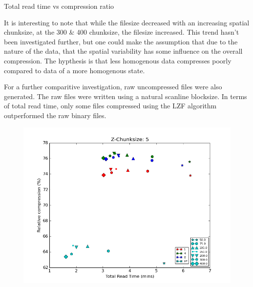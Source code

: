 \documentclass[a4paper]{article}
\begin{document}
      Total read time vs compression ratio
    
      \begin{flushleft}
      It is interesting to note that while the filesize decreased with an increasing spatial chunksize, at the 300 \& 400
      chunksize, the filesize increased. This trend hasn't been investigated further, but one could make the assumption
      that due to the nature of the data, that the spatial variability has some influence on the overall compression.
      The hypthesis is that less homogenous data compresses poorly compared to data of a more homogenous state.
      
      For a further comparitive investigation, raw uncompressed files were also generated. The raw files were written
      using a natural scanline blocksize. In terms of total read time, only some files compressed using the LZF
      algorithm outperformed the raw binary files.
      \end{flushleft}
      
      \begin{figure}[h!]
        \centering
        \includegraphics[scale=0.5]{Compression-ratio-vs-Read-time-z_chunk-5.png}
      \end{figure}
    
\end{document}
